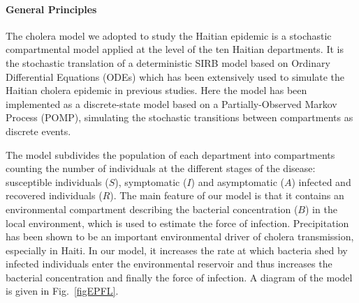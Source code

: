 \paragraph{General Principles} The cholera model we adopted to study the Haitian epidemic is a stochastic compartmental model applied at the level of the ten Haitian departments. 
It is the stochastic translation of a deterministic SIRB model based on Ordinary Differential Equations (ODEs) which has been extensively used to simulate the Haitian cholera epidemic in previous studies\cite{Rinaldo:Reassessment20102011:2012, Bertuzzo:PredictionSpatialEvolution:2011,Bertuzzo:ProbabilityExtinctionHaiti:2016,Pasetto:RealtimeForecastingCholera:2018, Lemaitre:RainfallDriverEpidemic:2019}. 
Here the model has been implemented as a discrete-state model based on a Partially-Observed Markov Process (POMP), simulating the stochastic transitions between compartments as discrete events\cite{King:InapparentInfectionsCholera:2008}.

The model subdivides the population of each department into compartments counting the number of individuals at the different stages of the disease: susceptible individuals ($S$), symptomatic ($I$) and asymptomatic ($A$) infected and recovered individuals ($R$). The main feature of our model is that it contains an environmental compartment describing the bacterial concentration ($B$) in the local environment, which is used to estimate the force of infection\cite{Rinaldo:Reassessment20102011:2012, Bertuzzo:PredictionSpatialEvolution:2011}. Precipitation has been shown to be an important environmental driver of cholera transmission\cite{Camacho:CholeraEpidemicYemen:2018}, especially in Haiti\cite{Rinaldo:Reassessment20102011:2012}. In our model, it increases the rate at which bacteria shed by infected individuals enter the environmental reservoir and thus increases the bacterial concentration and finally the force of infection\cite{Lemaitre:RainfallDriverEpidemic:2019}. A diagram of the model is given in Fig.~\ref{figEPFL}.
